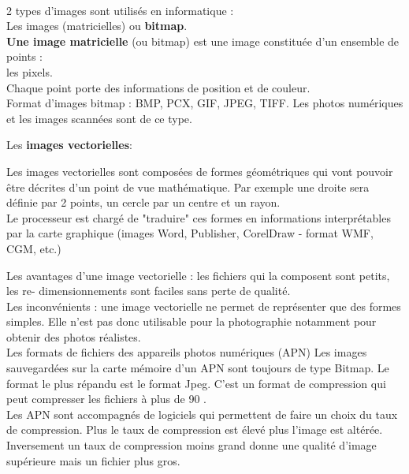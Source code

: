 \documentclass[10pt,fleqn]{article} %
\begin{document}
\begin{tcolorbox}[width=17cm,enhanced,colback=lightgray!5!white,colframe=red,title=Pour approfondir,
	attach boxed title to top left=
	{yshift=-\tcboxedtitleheight/2},
	boxed title style={size=small,colback=red}]
	~~\\
	
	
	
	
	
	
	
	
	2 types d'images sont utilisés en informatique :\\
	Les images (matricielles) ou \textbf{bitmap}.\\
	
	
	\textbf{Une image matricielle} (ou bitmap) est une image constituée d'un ensemble de points :\\ les pixels.\\
	Chaque point porte des informations de position et de couleur.\\
	Format d'images bitmap : BMP, PCX, GIF, JPEG, TIFF.
	Les photos numériques et les images scannées sont de ce type.
	
	\medskip
	
	
	
	Les \textbf{images vectorielles}:
	
	\medskip
	
	Les images vectorielles sont composées de formes géométriques qui vont pouvoir être décrites d'un
	point de vue mathématique. Par exemple une droite sera définie par 2 points, un cercle par un
	centre et un rayon.\\ Le processeur est chargé de "traduire" ces formes en informations
	interprétables par la carte graphique (images Word, Publisher, CorelDraw - format WMF, CGM, etc.)\
	
	\medskip
	
	Les avantages d'une image vectorielle : les fichiers qui la composent sont petits, les re-
	dimensionnements sont faciles sans perte de qualité.\\
	Les inconvénients : une image vectorielle ne permet de représenter que des formes simples. Elle
	n'est pas donc utilisable pour la photographie notamment pour obtenir des photos réalistes.\\
	
	
	Les formats de fichiers des appareils photos numériques (APN)
	Les images sauvegardées sur la carte mémoire d'un APN sont toujours de type Bitmap. Le format
	le plus répandu est le format Jpeg. C'est un format de compression qui peut compresser les
	fichiers à plus de 90 .\\
	
	Les APN sont accompagnés de logiciels qui permettent de faire un choix du taux de compression.
	Plus le taux de compression est élevé plus l'image est altérée. Inversement un taux de
	compression moins grand donne une qualité d'image supérieure mais un fichier plus gros.
	
\end{tcolorbox}
\end{document}
